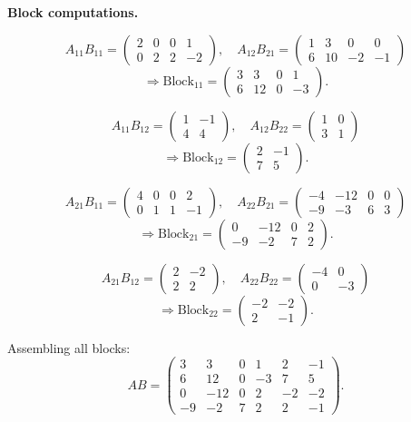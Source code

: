 \documentclass[12pt,a3paper]{article}
\begin{document}
\begin{tcolorbox}
\textbf{Block computations.}

\[
  A_{11}B_{11}=\begin{pmatrix}2&0&0&1\\0&2&2&-2\end{pmatrix},\quad
  A_{12}B_{21}=\begin{pmatrix}1&3&0&0\\6&10&-2&-1\end{pmatrix}
\]
\[
  \Rightarrow\text{Block}_{11}=\begin{pmatrix}3&3&0&1\\6&12&0&-3\end{pmatrix}.
\]

\[
  A_{11}B_{12}=\begin{pmatrix}1&-1\\4&4\end{pmatrix},\quad
  A_{12}B_{22}=\begin{pmatrix}1&0\\3&1\end{pmatrix}
\]
\[
  \Rightarrow\text{Block}_{12}=\begin{pmatrix}2&-1\\7&5\end{pmatrix}.
\]

\[
  A_{21}B_{11}=\begin{pmatrix}4&0&0&2\\0&1&1&-1\end{pmatrix},\quad
  A_{22}B_{21}=\begin{pmatrix}-4&-12&0&0\\-9&-3&6&3\end{pmatrix}
\]
\[
  \Rightarrow\text{Block}_{21}=\begin{pmatrix}0&-12&0&2\\-9&-2&7&2\end{pmatrix}.
\]

\[
  A_{21}B_{12}=\begin{pmatrix}2&-2\\2&2\end{pmatrix},\quad
  A_{22}B_{22}=\begin{pmatrix}-4&0\\0&-3\end{pmatrix}
\]
\[
  \Rightarrow\text{Block}_{22}=\begin{pmatrix}-2&-2\\2&-1\end{pmatrix}.
\]

Assembling all blocks:
\[
  \boxed{AB = \begin{pmatrix}
    3 & 3 & 0 & 1 & 2 & -1 \\
    6 & 12 & 0 & -3 & 7 & 5 \\
    0 & -12 & 0 & 2 & -2 & -2 \\
    -9 & -2 & 7 & 2 & 2 & -1
  \end{pmatrix}.}
\]

\end{tcolorbox}
\end{document}
